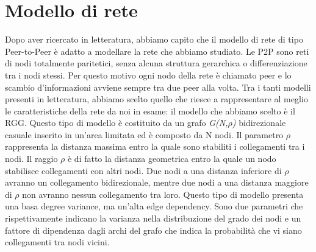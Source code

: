 \section{Modello di rete}
Dopo aver ricercato in letteratura, abbiamo capito che il modello di rete di tipo Peer-to-Peer è adatto a modellare la rete che abbiamo studiato. Le \acs{P2P} sono reti di nodi totalmente paritetici, senza alcuna struttura gerarchica o differenziazione tra i nodi stessi. Per questo motivo ogni nodo della rete è chiamato peer e lo scambio d'informazioni avviene sempre tra due peer alla volta. Tra i tanti modelli presenti in letteratura, abbiamo scelto quello che riesce a rappresentare al meglio le caratteristiche della rete da noi in esame: il modello che abbiamo scelto è il \acf{RGG}. Questo tipo di modello è costituito da un grafo \textit{G(N,$\rho$)} bidirezionale casuale inserito in un'area limitata ed è composto da N nodi. Il parametro $\rho$ rappresenta la distanza massima entro la quale sono stabiliti i collegamenti tra i nodi. Il raggio $\rho$ è di fatto la distanza geometrica entro la quale un nodo stabilisce collegamenti con altri nodi. Due nodi a una distanza inferiore di $\rho$ avranno un collegamento bidirezionale, mentre due nodi a una distanza maggiore di $\rho$ non avranno nessun collegamento tra loro. Questo tipo di modello presenta una basa degree variance, ma un'alta edge dependency. Sono due parametri che rispettivamente indicano la varianza nella distribuzione del grado dei nodi e un fattore di dipendenza dagli archi del grafo che indica la probabilità che vi siano collegamenti tra nodi vicini.


